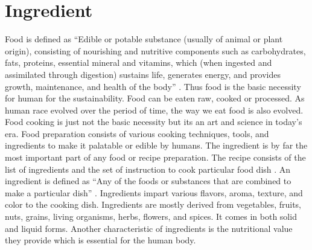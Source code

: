 \documentclass[sigconf]{acmart}
\begin{document}
\section{Ingredient}
Food is defined as ``Edible or potable substance (usually of animal or plant origin), consisting of nourishing and nutritive components such as carbohydrates, fats, proteins, essential mineral and vitamins, which (when ingested and assimilated through digestion) sustains life, generates energy, and provides growth, maintenance, and health of the body'' \cite{www-businessdictionary}. Thus food is the basic necessity for human for the sustainability. Food can be eaten raw, cooked or processed. As human race evolved over the period of time, the way we eat food is also evolved. Food cooking is just not the basic necessity but its an art and science in today's era. Food preparation consists of various cooking techniques, tools, and ingredients to make it palatable or edible by humans. The ingredient is by far the most important part of any food or recipe preparation. The recipe consists of the list of ingredients and the set of instruction to cook particular food dish \cite{www-collinsdictionary}. An ingredient is defined as ``Any of the foods or substances that are combined to make a particular dish'' \cite{www-oxforddictionaries}. Ingredients impart various flavors, aroma, texture, and color to the cooking dish. Ingredients are mostly derived from vegetables, fruits, nuts, grains, living organisms, herbs, flowers, and spices. It comes in both solid and liquid forms. Another characteristic of ingredients is the nutritional value they provide which is essential for the human body.
\end{document}
